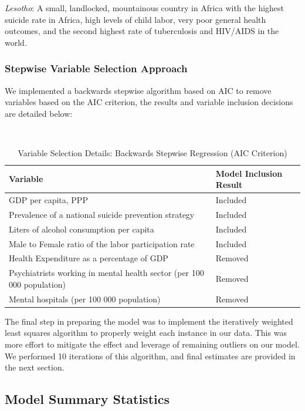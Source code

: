 \documentclass[]{article}
\begin{document}
\emph{Lesotho}: A small, landlocked, mountainous country in Africa with
the highest suicide rate in Africa, high levels of child labor, very
poor general health outcomes, and the second highest rate of
tuberculosis and HIV/AIDS in the world.

\newpage 

\subsubsection{Stepwise Variable Selection
Approach}\label{stepwise-variable-selection-approach}

We implemented a backwards stepwise algorithm based on AIC to remove
variables based on the AIC criterion, the results and variable inclusion
decisions are detailed below:

\begin{table}[H]
\centering 
\caption{Variable Selection Details: Backwards Stepwise Regression (AIC Criterion)}
\
\begin{tabular}{p{5cm}p{4cm}}  
\hline  
Variable & Model Inclusion Result \\  
\hline
GDP per capita, PPP & Included \\
\hline 
Prevalence of a national suicide prevention strategy & Included \\
\hline 
Liters of alcohol consumption per capita & Included \\
\hline 
Male to Female ratio of the labor participation rate & Included \\
\hline
Health Expenditure as a percentage of GDP & Removed \\
 \hline 
Psychiatrists working in mental health sector (per 100 000 population) & Removed \\   
\hline 
Mental hospitals (per 100 000 population) &  Removed \\
\hline 
\end{tabular} 
\end{table}

The final step in preparing the model was to implement the iteratively
weighted least squares algorithm to properly weight each instance in our
data. This was more effort to mitigate the effect and leverage of
remaining outliers on our model. We performed 10 iterations of this
algorithm, and final estimates are provided in the next section.

\subsection{Model Summary Statistics}\label{model-summary-statistics}
\end{document}

